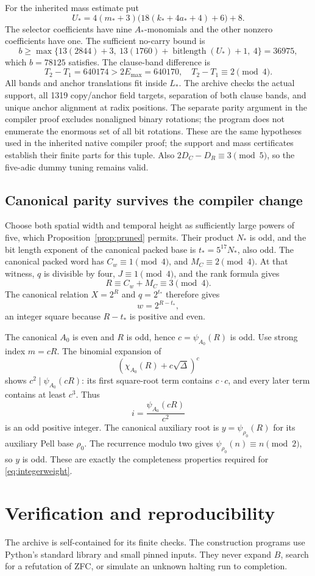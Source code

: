 \documentclass[11pt]{article}
\theoremstyle{definition}\newtheorem{definition}[theorem]{Definition}
\theoremstyle{remark}\newtheorem{remark}[theorem]{Remark}
\begin{document}
For the inherited mass estimate put
\[
U_*=4(m_*+3)\bigl(18(k_*+4a_*+4)+6\bigr)+8.
\]
The selector coefficients have nine $A_*$-monomials and the other nonzero coefficients have one. The sufficient no-carry bound is
\[
b\ge\max\{13(2844)+3,\ 13(1760)+\operatorname{bitlength}(U_*)+1,\ 4\}
=36975,
\]
which $b=78125$ satisfies. The clause-band difference is
\[
T_2-T_1=640174>2E_{\max}=640170,
\quad T_2-T_1\equiv2\pmod4.
\]
All bands and anchor translations fit inside $L_*$. The archive checks the actual support, all 1319 copy/anchor field targets, separation of both clause bands, and unique anchor alignment at radix positions. The separate parity argument in the compiler proof excludes nonaligned binary rotations; the program does not enumerate the enormous set of all bit rotations. These are the same hypotheses used in the inherited native compiler proof; the support and mass certificates establish their finite parts for this tuple. Also $2D_C-D_R\equiv3\pmod5$, so the five-adic dummy tuning remains valid.

\subsection{Canonical parity survives the compiler change}
\label{sec:parity}
Choose both spatial width and temporal height as sufficiently large powers of five, which Proposition~\ref{prop:pruned} permits. Their product $N_*$ is odd, and the bit length exponent of the canonical packed base is $t_*=5^{17}N_*$, also odd. The canonical packed word has $C_w\equiv1\pmod4$, and $M_C\equiv2\pmod4$. At that witness, $q$ is divisible by four, $J\equiv1\pmod4$, and the rank formula gives
\[
R\equiv C_w+M_C\equiv3\pmod4.
\]
The canonical relation $X=2^R$ and $q=2^{t_*}$ therefore gives
\[
w=2^{R-t_*},
\]
an integer square because $R-t_*$ is positive and even.

The canonical $A_0$ is even and $R$ is odd, hence $c=\psi_{A_0}(R)$ is odd. Use strong index $m=cR$. The binomial expansion of
\[
(\chi_{A_0}(R)+c\sqrt\Delta)^c
\]
shows $c^2\mid\psi_{A_0}(cR)$: its first square-root term contains $c\cdot c$, and every later term contains at least $c^3$. Thus
\[
i=\frac{\psi_{A_0}(cR)}{c^2}
\]
is an odd positive integer. The canonical auxiliary root is $y=\psi_{\rho_0}(R)$ for its auxiliary Pell base $\rho_0$. The recurrence modulo two gives $\psi_{\rho_0}(n)\equiv n\pmod2$, so $y$ is odd. These are exactly the completeness properties required for \eqref{eq:integerweight}.

\section{Verification and reproducibility}
\label{sec:checks}
The archive is self-contained for its finite checks. The construction programs use Python's standard library and small pinned inputs. They never expand $B$, search for a refutation of ZFC, or simulate an unknown halting run to completion.
\end{document}
